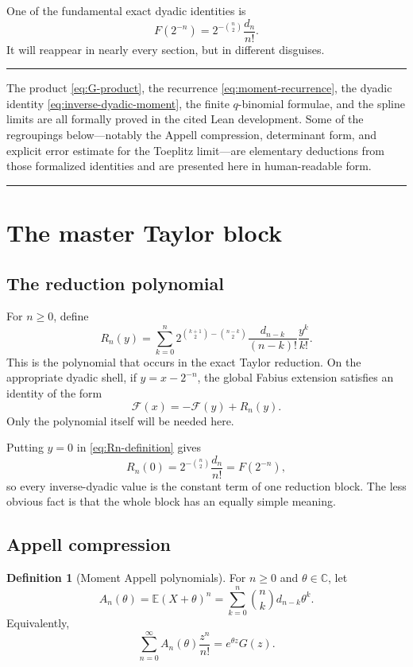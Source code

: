 \documentclass[11pt,oneside]{article}
\theoremstyle{definition}
\newtheorem{definition}[theorem]{Definition}
\theoremstyle{remark}
\newenvironment{boxedremark}
  {\par\medskip\noindent\begin{center}\begin{minipage}{0.94\textwidth}\color{deepgray}\hrule\vspace{0.7ex}}
  {\vspace{0.7ex}\hrule\end{minipage}\end{center}\medskip}
\newcommand{\C}{\mathbb C}
\newcommand{\E}{\mathbb E}
\newcommand{\Fglobal}{\mathcal F}
\begin{document}
One of the fundamental exact dyadic identities is
\begin{equation}\label{eq:inverse-dyadic-moment}
  F(2^{-n})=2^{-\binom n2}\frac{d_n}{n!}.
\end{equation}
It will reappear in nearly every section, but in different disguises.

\begin{boxedremark}
The product \eqref{eq:G-product}, the recurrence
\eqref{eq:moment-recurrence}, the dyadic identity
\eqref{eq:inverse-dyadic-moment}, the finite $q$-binomial formulae, and the
spline limits are all formally proved in the cited Lean development.  Some of
the regroupings below---notably the Appell compression, determinant form, and
explicit error estimate for the Toeplitz limit---are elementary deductions
from those formalized identities and are presented here in human-readable
form.
\end{boxedremark}

\section{The master Taylor block}

\subsection{The reduction polynomial}

For $n\ge0$, define
\begin{equation}\label{eq:Rn-definition}
 R_n(y)=
 \sum_{k=0}^{n}
 2^{\binom{k+1}{2}-\binom{n-k}{2}}
 \frac{d_{n-k}}{(n-k)!}\frac{y^k}{k!}.
\end{equation}
This is the polynomial that occurs in the exact Taylor reduction.  On the
appropriate dyadic shell, if $y=x-2^{-n}$, the global Fabius extension satisfies
an identity of the form
\[
  \Fglobal(x)=-\Fglobal(y)+R_n(y).
\]
Only the polynomial itself will be needed here.

Putting $y=0$ in \eqref{eq:Rn-definition} gives
\[
  R_n(0)=2^{-\binom n2}\frac{d_n}{n!}=F(2^{-n}),
\]
so every inverse-dyadic value is the constant term of one reduction block.
The less obvious fact is that the whole block has an equally simple meaning.

\subsection{Appell compression}

\begin{definition}[Moment Appell polynomials]\label{def:Appell}
For $n\ge0$ and $\theta\in\C$, let
\begin{equation}\label{eq:An-definition}
  A_n(\theta)=\E(X+\theta)^n
  =\sum_{k=0}^{n}\binom nk d_{n-k}\theta^k.
\end{equation}
Equivalently,
\begin{equation}\label{eq:Appell-egf}
  \sum_{n=0}^{\infty}A_n(\theta)\frac{z^n}{n!}
  =e^{\theta z}G(z).
\end{equation}
\end{definition}
\end{document}
